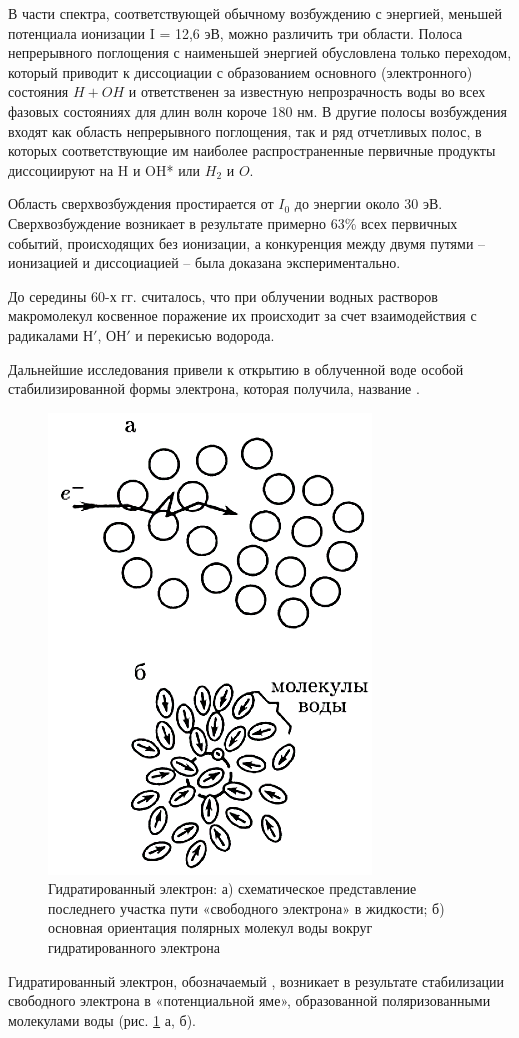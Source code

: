 \documentclass[a4paper, 14pt]{article}
\renewcommand{\emph}[1]{{\color{orange}{\textit{\textbf{#1}}}}}
\begin{document}
В части спектра, соответствующей обычному возбуждению с энергией, меньшей потенциала ионизации I = 12,6 эВ, можно различить три области. Полоса непрерывного поглощения с наименьшей энергией обусловлена только переходом, который приводит к диссоциации с образованием основного (электронного) состояния $H + OH$ и ответственен за известную непрозрачность воды во всех фазовых состояниях для длин волн короче 180 нм. В другие полосы возбуждения входят как область непрерывного поглощения, так и ряд отчетливых полос, в которых соответствующие им наиболее распространенные первичные продукты диссоциируют на H и OH* или $H_2$ и $O$. 

Область сверхвозбуждения простирается от $I_0$ до энергии около 30 эВ. Сверхвозбуждение возникает в результате примерно 63\% всех первичных событий, происходящих без ионизации, а конкуренция между двумя путями – ионизацией и диссоциацией – была доказана экспериментально. 

До середины 60-х гг. считалось, что при облучении водных растворов макромолекул косвенное поражение их происходит за счет взаимодействия с радикалами $Н'$, $ОН'$ и перекисью водорода. 

Дальнейшие исследования привели к открытию в облученной воде особой стабилизированной формы электрона, которая получила, название \emph{«гидратированный электрон»}.

\begin{figure}
    \centering
    \includegraphics[width=.4\textwidth]{hydratedElectron.png}
    \caption{Гидратированный электрон: а) схематическое представление последнего участка пути «свободного электрона» в жидкости; б) основная ориентация полярных молекул воды вокруг гидратированного электрона}
    \label{hydratedElectron}
\end{figure}
Гидратированный электрон, обозначаемый \emph{\ce{e^{-}_{гидр.}}}, возникает в результате
стабилизации свободного электрона в «потенциальной яме», образованной
поляризованными молекулами воды (рис. \ref{hydratedElectron} а, б).
\end{document}
